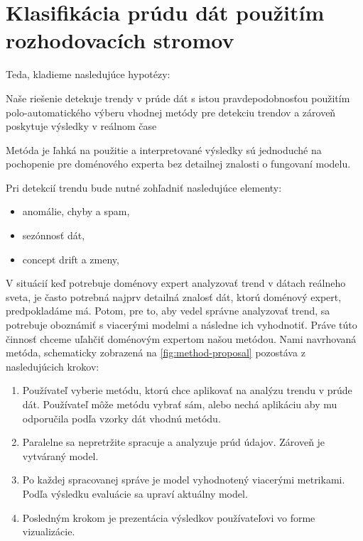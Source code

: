 \chapter{Klasifikácia prúdu dát použitím rozhodovacích stromov}
\label{Klasifikácia prúdu dát použitím rozhodovacích stromov}








Teda, kladieme nasledujúce hypotézy:
\begin{hypothesis}{Naše riešenie detekuje trendy v prúde dát s istou pravdepodobnosťou použitím polo-automatického výberu vhodnej metódy pre detekciu trendov a zároveň poskytuje výsledky v reálnom čase}
\end{hypothesis}
\begin{hypothesis}{Metóda je ľahká na použitie a interpretované výsledky sú jednoduché na pochopenie pre doménového experta bez detailnej znalosti o fungovaní modelu.}
\end{hypothesis}

Pri detekcií trendu bude nutné zohľadniť nasledujúce elementy:
\begin{itemize}
	\item anomálie, chyby a spam,
	\item sezónnosť dát,
	\item concept drift a zmeny,
\end{itemize}

V situácií keď potrebuje doménovy expert analyzovať trend v dátach reálneho sveta, je často potrebná najprv detailná znalosť dát, ktorú doménový expert, predpokladáme má. Potom, pre to, aby vedel správne analyzovať trend, sa potrebuje oboznámiť s viacerými modelmi a následne ich vyhodnotiť. Práve túto činnosť chceme uľahčiť doménovým expertom našou metódou. Nami navrhovaná metóda, schematicky zobrazená na \ref{fig:method-proposal} pozostáva z nasledujúcich krokov:
\begin{enumerate}
	\item Používateľ vyberie metódu, ktorú chce aplikovať na analýzu trendu v prúde dát. Používateľ môže metódu vybrať sám, alebo nechá aplikáciu aby mu odporučila podľa vzorky dát vhodnú metódu.
	\item Paralelne sa nepretržite spracuje a analyzuje prúd údajov. Zároveň je vytváraný model.
	\item Po každej spracovanej správe je model vyhodnotený viacerými metrikami. Podľa výsledku evaluácie sa upraví aktuálny model.
	\item Posledným krokom je prezentácia výsledkov používateľovi vo forme vizualizácie.
\end{enumerate}
\label{fig:method-proposal}


